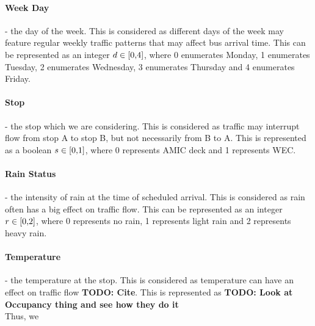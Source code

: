 \documentclass[12pt]{extarticle}
\begin{document}
\paragraph{Week Day} - the day of the week. This is considered as different days of the week may feature regular weekly traffic patterns that may affect bus arrival time. This can be represented as an integer $d \in \interval[{0,4}]$, where 0 enumerates Monday, 1 enumerates Tuesday, 2 enumerates Wednesday, 3 enumerates Thursday and 4 enumerates Friday.
\paragraph{Stop} - the stop which we are considering. This is considered as traffic may interrupt flow from stop A to stop B, but not necessarily from B to A. This is represented as a boolean $s \in \interval[{0,1}]$, where 0 represents AMIC deck and 1 represents WEC.
\paragraph{Rain Status} - the intensity of rain at the time of scheduled arrival. This is considered as rain often has a big effect on traffic flow. This can be represented as an integer $r \in \interval[{0,2}]$, where 0 represents no rain, 1 represents light rain and 2 represents heavy rain.
\paragraph{Temperature} - the temperature at the stop. This is considered as temperature can have an effect on traffic flow \textbf{TODO: Cite}. This is represented as \textbf{TODO: Look at Occupancy thing and see how they do it}
\\
Thus, we 
\end{document}
